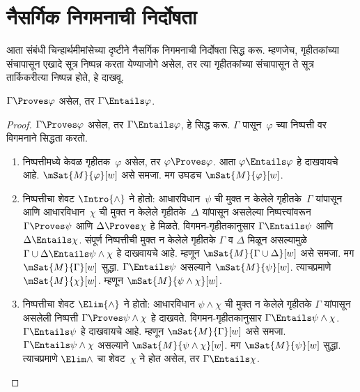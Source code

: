 \section{नैसर्गिक निगमनाची निर्दोषता}\label{int:sc:snd:sec}

आता संबंधी चिन्हार्थमीमांसेच्या दृष्टीने नैसर्गिक निगमनाची
निर्दोषता सिद्ध करू. म्हणजेच, गृहीतकांच्या संचापासून
एखादे सूत्र निष्पन्न करता येण्याजोगे असेल, तर त्या
गृहीतकांच्या संचापासून ते सूत्र
तार्किकरीत्या निष्पन्न होते, हे दाखवू.

\begin{thm}[निर्दोषता]
  \label{int:sc:snd:thm:soundness}
  $\Gamma \Proves \varphi$ असेल, तर $ \Gamma \Entails \varphi$.
\end{thm}

\begin{proof}
  $\Gamma \Proves \varphi$ असेल, तर $\Gamma \Entails \varphi$,
  हे सिद्ध करू. $\Gamma$ पासून~$\varphi$ च्या
  निष्पत्ती वर विगमनाने सिद्धता करतो.

  \begin{enumerate}
  \item निष्पत्तीमध्ये केवळ गृहीतक~$\varphi$ असेल,
    तर $\varphi \Proves \varphi$. आता $\varphi \Entails \varphi$ हे
    दाखवायचे आहे. $ \mSat{M}{\varphi}[w]$ असे समजा.
    मग उघडच $\mSat{M}{\varphi}[w]$.

  \item निष्पत्तीचा शेवट $\Intro{\land}$ ने होतो:
    आधारविधान~$\psi$ ची
      मुक्त न केलेले गृहीतके~$\Gamma$ यांपासून आणि
      आधारविधान~$\chi$ ची मुक्त न केलेले
      गृहीतके~$\Delta$ यांपासून असलेल्या
      निष्पत्त्यांवरून $\Gamma \Proves
      \psi$ आणि $\Delta \Proves \chi$ हे मिळते.
      विगमन-गृहीतकानुसार $\Gamma \Entails \psi$
      आणि $\Delta \Entails \chi$. संपूर्ण
      निष्पत्तीची मुक्त न केलेले गृहीतके
      $\Gamma$ व $\Delta$ मिळून असल्यामुळे
      $\Gamma \cup \Delta \Entails \psi \land \chi$
      हे दाखवायचे आहे. म्हणून
      $\mSat{M}{\Gamma \cup \Delta}[w]$ असे समजा.
      मग $\mSat{M}{\Gamma}[w]$ सुद्धा.
      $\Gamma \Entails \psi$ असल्याने
      $\mSat{M}{\psi}[w]$. त्याचप्रमाणे
      $\mSat{M}{\chi}[w]$. म्हणून
      $\mSat{M}{\psi \land \chi}[w]$.

  \item निष्पत्तीचा शेवट $\Elim{\land}$ ने होतो:
    आधारविधान $\psi
        \land \chi$ ची मुक्त न केलेले गृहीतके
        $\Gamma$ यांपासून असलेली निष्पत्ती
        $\Gamma \Proves \psi \land \chi$ हे दाखवते.
        विगमन-गृहीतकानुसार
        $\Gamma \Entails \psi \land \chi$.
        $\Gamma \Entails \psi$ हे दाखवायचे आहे.
        म्हणून $\mSat{M}{\Gamma}[w]$ असे समजा.
        $\Gamma \Entails \psi \land \chi$
        असल्याने $\mSat{M}{\psi \land \chi}[w]$.
        मग $\mSat{M}{\psi}[w]$ सुद्धा.
        त्याचप्रमाणे $\Elim\land$ चा शेवट~$\chi$
        ने होत असेल, तर $\Gamma \Entails \chi$.


\end{enumerate}
\end{proof}
